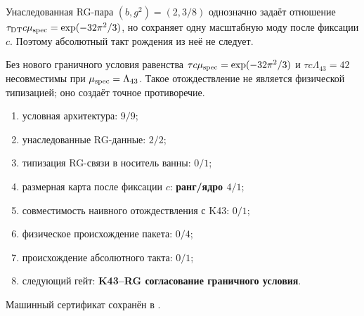 \begin{theorem}
Унаследованная RG-пара $(b,g^2)=(2,3/8)$ однозначно задаёт отношение
$\tau_{\rm DT}c\mu_{\rm spec}=\exp(-32\pi^2/3)$, но сохраняет одну
масштабную моду после фиксации $c$. Поэтому абсолютный такт рождения из неё
не следует.
\end{theorem}

\begin{nogocriterion}
Без нового граничного условия равенства
$\tau c\mu_{\rm spec}=\exp(-32\pi^2/3)$ и
$\tau c\Lambda_{43}=42$ несовместимы при
$\mu_{\rm spec}=\Lambda_{43}$. Такое отождествление не является физической
типизацией; оно создаёт точное противоречие.
\end{nogocriterion}

\begin{protocol}\begin{enumerate}
\item условная архитектура: \textbf{$9/9$};
\item унаследованные RG-данные: \textbf{$2/2$};
\item типизация RG-связи в носитель ванны: \textbf{$0/1$};
\item размерная карта после фиксации $c$: \textbf{ранг/ядро $4/1$};
\item совместимость наивного отождествления с K43: \textbf{$0/1$};
\item физическое происхождение пакета: \textbf{$0/4$};
\item происхождение абсолютного такта: \textbf{$0/1$};
\item следующий гейт: \textbf{K43--RG согласование граничного условия}.
\end{enumerate}\end{protocol}

Машинный сертификат сохранён в
.